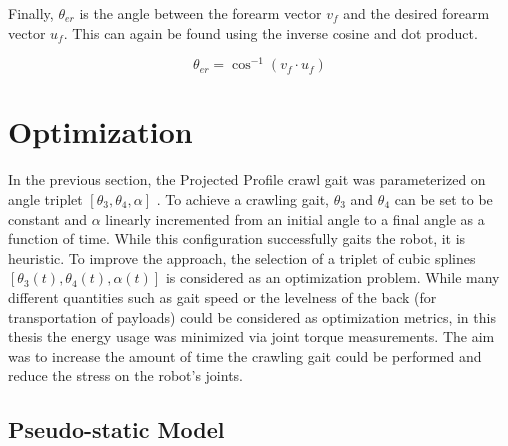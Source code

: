 Finally, $\theta_{er}$ is the angle between the forearm vector $v_f$ and the desired forearm vector $u_f$.
This can again be found using the inverse cosine and dot product.

\begin{equation}
	\theta_{er} = \cos^{-1}(v_{f} \cdot u_{f})
\end{equation}


\section{Optimization}

In the previous section, the Projected Profile crawl gait was parameterized on angle triplet 
$[ \theta_3, \theta_4, \alpha ]$ .
To achieve a crawling gait, $\theta_3$ and $\theta_4$ can be set to be constant and $\alpha$ linearly incremented
from an initial angle to a final angle as a function of time. While this configuration successfully gaits the robot,
it is heuristic. To improve the approach, the selection of a triplet of cubic splines 
$[\theta_3(t), \theta_4(t), \alpha(t)]$ is considered as an optimization problem. 
While many different quantities such as gait speed or the levelness of the back 
(for transportation of payloads) could be considered as optimization metrics, in this thesis the energy usage was 
minimized via joint torque measurements.
The aim was to increase the amount of time the crawling gait could be performed and reduce the stress on the robot's joints.

\subsection{Pseudo-static Model}

